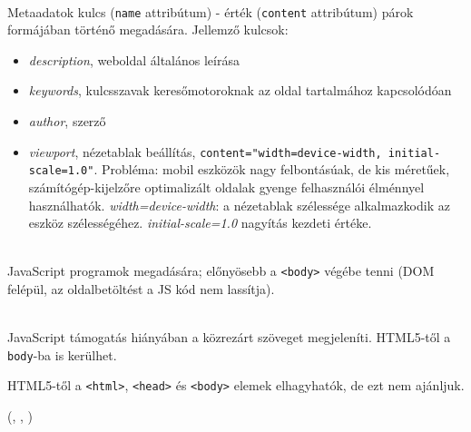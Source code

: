 \begin{frame}
  \begin{description}[m]
    \item[\texttt{<meta>}] \hfill \\ Metaadatok kulcs (\texttt{name} attribútum) - érték (\texttt{content} attribútum) párok formájában történő megadására. Jellemző kulcsok:
    \begin{itemize}
      \item \emph{description}, weboldal általános leírása
      \item \emph{keywords}, kulcsszavak keresőmotoroknak az oldal tartalmához kapcsolódóan
      \item \emph{author}, szerző
      \item \emph{viewport}, nézetablak beállítás, \texttt{content="width=device-width, initial-scale=1.0"}. Probléma: mobil eszközök nagy felbontásúak, de kis méretűek, számítógép-kijelzőre optimalizált oldalak gyenge felhasználói élménnyel használhatók. \emph{width=device-width}: a nézetablak szélessége alkalmazkodik az eszköz szélességéhez. \emph{initial-scale=1.0} nagyítás kezdeti értéke. 
    \end{itemize}
  \end{description}
\end{frame}

\begin{frame}
  \begin{description}[m]
    \item[\texttt{<script>}] \hfill \\ JavaScript programok megadására; előnyösebb a \texttt{<body>} végébe tenni (DOM felépül, az oldalbetöltést a JS kód nem lassítja).
    \item[\texttt{<noscript>}] \hfill \\ JavaScript támogatás hiányában a közrezárt szöveget megjeleníti. HTML5-től a \texttt{body}-ba is kerülhet.
  \end{description}
  \vfill
  HTML5-től a \texttt{<html>}, \texttt{<head>} és \texttt{<body>} elemek elhagyhatók, de ezt nem ajánljuk.
\end{frame}

\begin{frame}
  \begin{exampleblock}{ (, , )}
    \scriptsize
    
  \end{exampleblock}
\end{frame}

